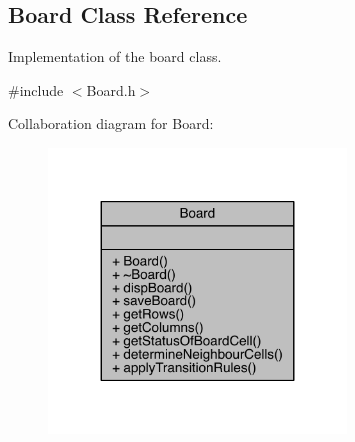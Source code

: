 \hypertarget{a00009}{}\subsection{Board Class Reference}
\label{a00009}


Implementation of the board class.  




{\ttfamily \#include $<$Board.\+h$>$}



Collaboration diagram for Board\+:\nopagebreak
\begin{figure}[H]
\begin{center}
\leavevmode
\includegraphics[width=224pt]{a00155}
\end{center}
\end{figure}
